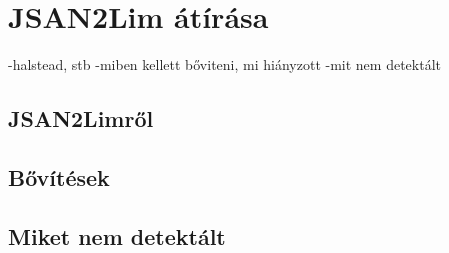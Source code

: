 \chapter{JSAN2Lim átírása}\label{chap:JSAN2Lim átírása}
-halstead, stb
-miben kellett bőviteni, mi hiányzott
-mit nem detektált
\section{JSAN2Limről}

\section{Bővítések}

\section{Miket nem detektált}
